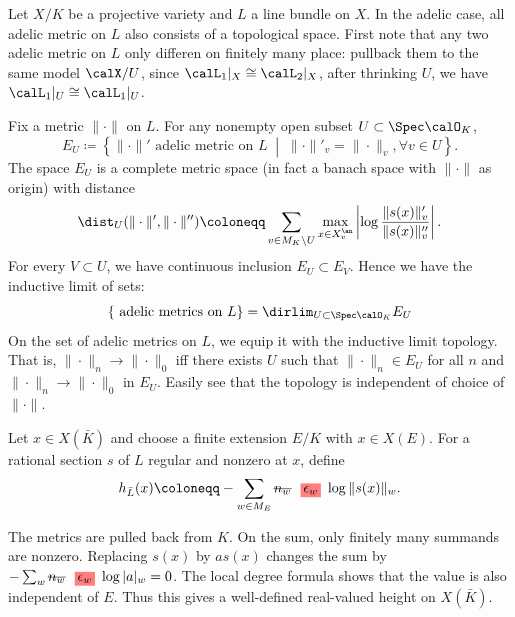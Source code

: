 \begin{construction}[label=\labelNFM{constr:topology-on-the-adelic-metrics-on-a-line-bundle}, status=draft, tag=0000000]
	Let $X/K$ be a projective variety and $L$ a line bundle on $X$.
	In the adelic case, all adelic metric on $L$ also consists of a topological space.
	First note that any two adelic metric on $L$ only differen on finitely many place: pullback them to the same model $\calX/U$, since $\calL_1|_X \cong \calL_2|_X$, after thrinking $U$, we have $\calL_1|_U \cong \calL_1|_U$.

	Fix a metric $\|\cdot\|$ on $L$.
	For any nonempty open subset $U \subset \Spec \calO_K$,
	\[ E_U \coloneqq \left\{ \|\cdot\|' \text{ adelic metric on } L  \;\middle|\; \|\cdot\|'_v = \|\cdot\|_v, \forall v \in U \right\}. \]
	The space $E_U$ is a complete metric space (in fact a banach space with $\|\cdot\|$ as origin) with distance
	\[  \dist_U(\|\cdot\|',\|\cdot\|'') \coloneqq \sum_{v \in M_K \setminus U}\max_{x \in X^\an_v} \left| \log \frac{\|s(x)\|_v'}{\|s(x)\|_v''} \right|. \]
	For every $V \subset U$, we have continuous inclusion $E_U \subset E_V$.
	Hence we have the inductive limit of sets:
	\[ \{\text{ adelic metrics on } L\} = \dirlim_{U \subset \Spec \calO_K} E_U \]
	On the set of adelic metrics on $L$, we equip it with the inductive limit topology.
	That is, $\|\cdot\|_n \to \|\cdot\|_0$ iff there exists $U$ such that $\|\cdot\|_n \in E_U$ for all $n$ and $\|\cdot\|_n \to \|\cdot\|_0$ in $E_U$.
	Easily see that the topology is independent of choice of $\|\cdot\|$.
\end{construction}

\begin{definition}[label=\labelNFM{def:height-of-an-algebraic-point}, status=draft, tag=0000000]
	Let $x \in X(\bar K)$ and choose a finite extension $E/K$ with $x \in X(E)$.
	For a rational section $s$ of $L$ regular and nonzero at $x$, define
	\[ h_{\bar L}(x) \coloneqq -\sum_{w \in M_E} \latexdeletedmath{n_w}\latexaddedmath{\epsilon_w}\log\|s(x)\|_w. \]
\end{definition}

The metrics are pulled back from $K$.
On the sum, only finitely many summands are nonzero.
Replacing $s(x)$ by $a s(x)$ changes the sum by $-\sum_w \latexdeletedmath{n_w}\latexaddedmath{\epsilon_w}\log|a|_w = 0$.
The local degree formula shows that the value is also independent of $E$.
Thus this gives a well-defined real-valued height on $X(\bar K)$.

